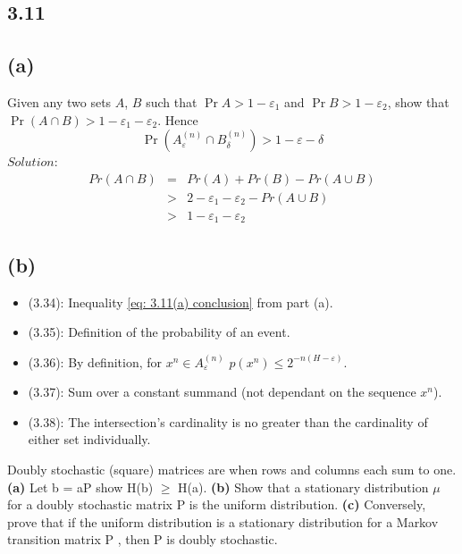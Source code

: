 \documentclass[10pt]{article}
\begin{document}
\begin{tiny}
\begin{multicols}{3}
\section*{3.11}

\subsection*{(a)}

Given any two sets $A$, $B$ such that $\Pr{A} > 1-\varepsilon_1$ and
$\Pr{B} > 1-\varepsilon_2$, show that $\Pr(A\cap B) > 1 - \varepsilon_1 -
\varepsilon_2$. Hence
\begin{equation}
    \Pr(A_\varepsilon^{(n)} \cap B_\delta^{(n)}) > 1 - \varepsilon - \delta
    \label{eq: 3.11(a) conclusion}
\end{equation}
$Solution$:
\begin{eqnarray}
    Pr(A\cap B) &=& Pr(A) + Pr(B) - Pr(A\cup B)
    \label{eq: pr A intersect B} \\
    &>& 2 - \varepsilon_1 - \varepsilon_2 - Pr(A\cup B)
    \label{eq: sub hypotheses} \\
    &>& 1 - \varepsilon_1 - \varepsilon_2
    \label{eq: 3.11a}
\end{eqnarray}

\subsection*{(b)}
\begin{itemize}
    \item (3.34): Inequality \ref{eq: 3.11(a) conclusion} from part (a).
    \item (3.35): Definition of the probability of an event.
    \item (3.36): By definition, for $x^n \in A_\varepsilon^{(n)}$
        $p(x^n) \leq 2^{-n(H - \varepsilon)}$.
    \item (3.37): Sum over a constant summand (not dependant on the
        sequence $x^n$).
    \item (3.38): The intersection's cardinality is no greater than the cardinality of either set individually.
\end{itemize}



Doubly stochastic (square) matrices are when rows and columns each sum to one. \textbf{(a)}  Let b = aP show H(b) $\ge$ H(a). \textbf{(b)} Show that a stationary distribution $\mu$ for a doubly stochastic matrix P is the uniform distribution. \textbf{(c)} Conversely, prove that if the uniform distribution is a stationary distribution for a Markov transition matrix P , then P is doubly stochastic.


\end{multicols}
\end{tiny}
\end{document}
